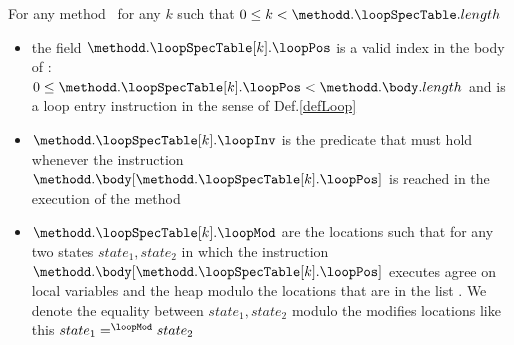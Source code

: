 For any method \methodd \ for any $ k $ such that $ 0 \leq k < \methodd.\loopSpecTable.length$ 
          \begin{itemize}
                \item the field $\methodd.\loopSpecTable[k].\loopPos$ is a valid index in the body of \methodd:\\
                      $ 0 \leq   \methodd.\loopSpecTable[k].\loopPos < \methodd.\body.length$ and is a loop entry
                      instruction in the sense of Def.\ref{defLoop}

	        \item $\methodd.\loopSpecTable[k].\loopInv$ is the predicate that must hold whenever the instruction 
		      $\methodd.\body[ \methodd.\loopSpecTable[k].\loopPos]$ 
                      is  reached in the execution of the method \methodd

                \item $\methodd.\loopSpecTable[k].\loopMod$ are the locations such that for any two states
                      $state_1, state_2 $  in which the instruction $\methodd.\body[ \methodd.\loopSpecTable[k].\loopPos]$ 
		      executes agree on local variables and the heap modulo the locations that are in the list \loopMod.
                      We denote the equality between  $state_1, state_2 $   modulo the modifies locations like this 
                      $ state_1 =^{\loopMod} state_2$
	  \end{itemize}
